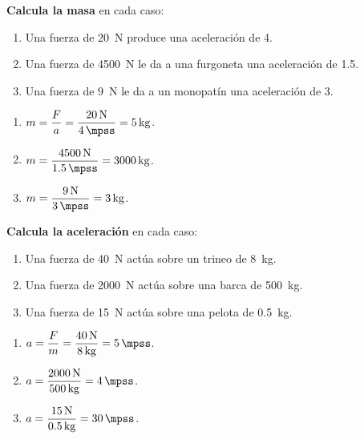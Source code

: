 \begin{exercise}
    \textbf{Calcula la masa} en cada caso:
    \begin{enumerate}[label=\letraminuscula]
        \item Una fuerza de \qty{20}{\newton} produce una aceleración de \qty{4}{\mpss}.
        \item Una fuerza de \qty{4500}{\newton} le da a una furgoneta una aceleración de \qty{1.5}{\mpss}.
        \item Una fuerza de \qty{9}{\newton} le da a un monopatín una aceleración de \qty{3}{\mpss}.
    \end{enumerate}
    \begin{solu}
        \begin{enumerate}[label=\alph*)]
            \item \(m = \dfrac{F}{a} = \dfrac{\qty{20}{\newton}}{\qty{4}{\mpss}} = \qty{5}{\kg}\).
            \item \(m = \dfrac{\qty{4500}{\newton}}{\qty{1.5}{\mpss}} = \qty{3000}{\kg}\).
            \item \(m = \dfrac{\qty{9}{\newton}}{\qty{3}{\mpss}} = \qty{3}{\kg}\).
        \end{enumerate}
    \end{solu}
\end{exercise}

\begin{exercise}
    \textbf{Calcula la aceleración} en cada caso:
    \begin{enumerate}[label=\letraminuscula]
        \item Una fuerza de \qty{40}{\newton} actúa sobre un trineo de \qty{8}{\kg}.
        \item Una fuerza de \qty{2000}{\newton} actúa sobre una barca de \qty{500}{\kg}.
        \item Una fuerza de \qty{15}{\newton} actúa sobre una pelota de \qty{0.5}{\kg}.
    \end{enumerate}
    \begin{solu}
        \begin{enumerate}[label=\alph*)]
            \item \(a = \dfrac{F}{m} = \dfrac{\qty{40}{\newton}}{\qty{8}{\kg}} = \qty{5}{\mpss}\).
            \item \(a = \dfrac{\qty{2000}{\newton}}{\qty{500}{\kg}} = \qty{4}{\mpss}\).
            \item \(a = \dfrac{\qty{15}{\newton}}{\qty{0.5}{\kg}} = \qty{30}{\mpss}\).
        \end{enumerate}
    \end{solu}
\end{exercise}

